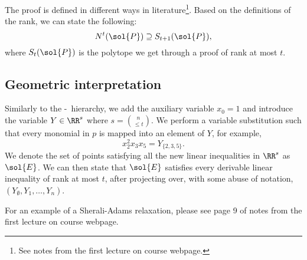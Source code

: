 \documentclass[a4paper,twoside,justified]{tufte-handout}
\begin{document}
The  proof is defined in different ways in literature\footnote{See notes from the first lecture on course webpage.}. Based on the definitions of the rank, we can state the following:
\begin{equation}
 N^{t}(\sol{P}) \supseteq S_{t+1}(\sol{P}) ,
\end{equation}
where $S_{t}(\sol{P})$ is the polytope we get through a proof of rank at most $ t $.

\subsection{Geometric interpretation}
Similarly to the \Lovasz-\Schrijver\ hierarchy, we add the auxiliary variable $x_0=1$ and introduce the variable $Y\in \RR^{s} $ where $ s=\binom{n}{\leq t}$. We perform a variable substitution such that every monomial in $p$ is mapped into an element of $Y$, for example,
\begin{equation*}
x^{2}_{2} x_{3}x_{5} = Y_{\{2,3,5\}}. 
\end{equation*}
We denote the set of points satisfying all the new linear inequalities in $\RR^{s}$ as $\sol{E}$. We can then state that $\sol{E}$ satisfies every derivable linear inequality of rank at most $t$, after projecting over, with some abuse of notation, $(Y_{\emptyset},Y_{1},\ldots,Y_{n})$.

For an example of a Sherali-Adams relaxation, please see page 9 of notes from the first lecture on course webpage.





\end{document}
